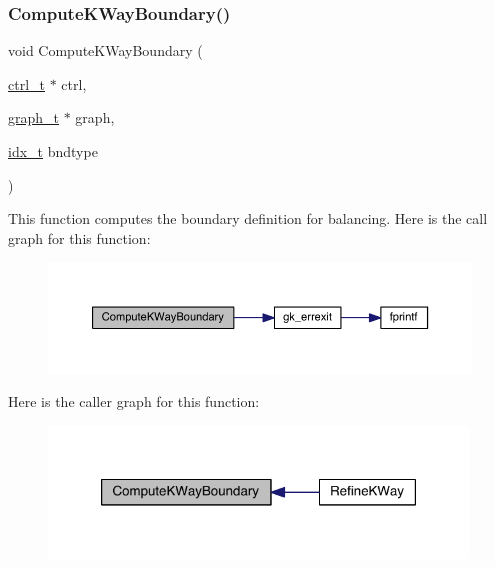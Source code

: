 \subsubsection{\texorpdfstring{Compute\+K\+Way\+Boundary()}{ComputeKWayBoundary()}}
{\footnotesize\ttfamily void Compute\+K\+Way\+Boundary (\begin{DoxyParamCaption}\item[{\hyperlink{a00742}{ctrl\+\_\+t} $\ast$}]{ctrl,  }\item[{\hyperlink{a00734}{graph\+\_\+t} $\ast$}]{graph,  }\item[{\hyperlink{a00876_aaa5262be3e700770163401acb0150f52}{idx\+\_\+t}}]{bndtype }\end{DoxyParamCaption})}

This function computes the boundary definition for balancing. Here is the call graph for this function\+:\nopagebreak
\begin{figure}[H]
\begin{center}
\leavevmode
\includegraphics[width=350pt]{a00945_aa23b4d433fc175282f237653d3edb8a5_cgraph}
\end{center}
\end{figure}
Here is the caller graph for this function\+:\nopagebreak
\begin{figure}[H]
\begin{center}
\leavevmode
\includegraphics[width=316pt]{a00945_aa23b4d433fc175282f237653d3edb8a5_icgraph}
\end{center}
\end{figure}
\mbox{\label{a00945_afd723ab2f44ffaa25d1d9f1909e06dfd}} 
